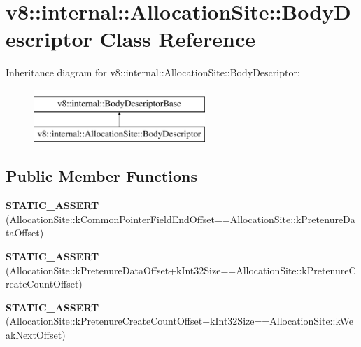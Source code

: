 \hypertarget{classv8_1_1internal_1_1AllocationSite_1_1BodyDescriptor}{}\section{v8\+:\+:internal\+:\+:Allocation\+Site\+:\+:Body\+Descriptor Class Reference}
\label{classv8_1_1internal_1_1AllocationSite_1_1BodyDescriptor}
Inheritance diagram for v8\+:\+:internal\+:\+:Allocation\+Site\+:\+:Body\+Descriptor\+:\begin{figure}[H]
\begin{center}
\leavevmode
\includegraphics[height=2.000000cm]{classv8_1_1internal_1_1AllocationSite_1_1BodyDescriptor}
\end{center}
\end{figure}
\subsection*{Public Member Functions}
\begin{DoxyCompactItemize}
\item 
\mbox{\label{classv8_1_1internal_1_1AllocationSite_1_1BodyDescriptor_a9d34e8bb8ecfa4f961d2a38fcd28983d}} 
{\bfseries S\+T\+A\+T\+I\+C\+\_\+\+A\+S\+S\+E\+RT} (Allocation\+Site\+::k\+Common\+Pointer\+Field\+End\+Offset==Allocation\+Site\+::k\+Pretenure\+Data\+Offset)
\item 
\mbox{\label{classv8_1_1internal_1_1AllocationSite_1_1BodyDescriptor_ac279fc126224d3a3a2515d7b80db1446}} 
{\bfseries S\+T\+A\+T\+I\+C\+\_\+\+A\+S\+S\+E\+RT} (Allocation\+Site\+::k\+Pretenure\+Data\+Offset+k\+Int32\+Size==Allocation\+Site\+::k\+Pretenure\+Create\+Count\+Offset)
\item 
\mbox{\label{classv8_1_1internal_1_1AllocationSite_1_1BodyDescriptor_ab4ce54abcc8531e19e908640dade56b1}} 
{\bfseries S\+T\+A\+T\+I\+C\+\_\+\+A\+S\+S\+E\+RT} (Allocation\+Site\+::k\+Pretenure\+Create\+Count\+Offset+k\+Int32\+Size==Allocation\+Site\+::k\+Weak\+Next\+Offset)
\end{DoxyCompactItemize}
